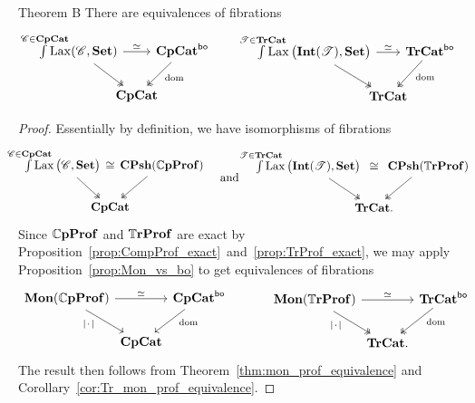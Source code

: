 \documentclass[11pt,oneside,article]{memoir}
\begin{document}
\begin{named}{Theorem B}
    \label{thm:TheoremB}
  There are equivalences of fibrations
  \begin{equation*}
    \begin{tikzcd}[column sep=-1em]
      \int\limits^{\mathclap{\cat{C}\in\CompCat}} \Lax(\cat{C},\Set)
          \ar[rr,"\equiv"] \ar[dr,two heads]
        && \CompCat^{\bo} \ar[dl,two heads,"\dom" pos=.4] \\
      & \CompCat &
    \end{tikzcd}
    \qquad\quad
    \begin{tikzcd}[column sep=-1em]
      \int\limits^{\mathclap{\cat{T}\in\TrCat}} \Lax\big(\Int(\cat{T}),\Set\big)
          \ar[rr,"\equiv"] \ar[dr,two heads]
        && \TrCat^{\bo} \ar[dl,two heads,"\dom" pos=.4] \\
      & \TrCat &
    \end{tikzcd}
  \end{equation*}
\end{named}
\begin{proof}
  Essentially by definition, we have isomorphisms of fibrations
  \begin{equation*}
    \begin{tikzcd}[column sep=-2em]
      \int\limits^{\mathclap{\cat{C}\in\CompCat}}\Lax\big(\cat{C},\Set\big)~
          \ar[rr,phantom,"\iso"] \ar[dr,two heads]
        && ~\CPsh(\dCompProf) \ar[dl,two heads] \\
      & \CompCat &
    \end{tikzcd}
    \quad\text{and}\quad
    \begin{tikzcd}[column sep=-2em]
      \int\limits^{\mathclap{\cat{T}\in\TrCat}}\Lax\big(\Int(\cat{T}),\Set\big)~~
          \ar[rr,phantom,"\iso"] \ar[dr,two heads]
        && ~~\CPsh(\dTrProf) \ar[dl,two heads] \\
      & \TrCat. &
    \end{tikzcd}
  \end{equation*}
  Since $\mathbb{C}\mathbf{pProf}$ and $\mathbb{T}\mathbf{rProf}$ are exact by
  Proposition~\ref{prop:CompProf_exact}~and~\ref{prop:TrProf_exact}, we may apply
  Proposition~\ref{prop:Mon_vs_bo} to get equivalences of fibrations
  \begin{equation*}
    \begin{tikzcd}[column sep=0em]
      \Mon(\dCompProf) \ar[rr,"\equiv"] \ar[dr,"\MOb"' pos=.3]
        && \CompCat^{\bo} \ar[dl,"\dom" pos=.3] \\
      & \CompCat &
    \end{tikzcd}
    \qquad\quad
    \begin{tikzcd}[column sep=0em]
      \Mon(\dTrProf) \ar[rr,"\equiv"] \ar[dr,two heads,"\MOb"' pos=.3]
        && \TrCat^{\bo} \ar[dl,two heads,"\dom" pos=.3] \\
      & \TrCat. &
    \end{tikzcd}
  \end{equation*}
  The result then follows from Theorem~\ref{thm:mon_prof_equivalence} and
  Corollary~\ref{cor:Tr_mon_prof_equivalence}.
\end{proof}
\end{document}
